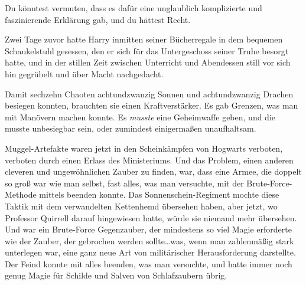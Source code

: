 Du könntest vermuten, dass es dafür eine unglaublich komplizierte und faszinierende Erklärung gab, und du hättest Recht.

Zwei Tage zuvor hatte Harry inmitten seiner Bücherregale in dem bequemen Schaukelstuhl gesessen, den er sich für das Untergeschoss seiner Truhe besorgt hatte, und in der stillen Zeit zwischen Unterricht und Abendessen still vor sich hin gegrübelt und über Macht nachgedacht.

Damit sechzehn Chaoten achtundzwanzig Sonnen und achtundzwanzig Drachen besiegen konnten, brauchten sie einen Kraftverstärker. Es gab Grenzen, was man mit Manövern machen konnte. Es \emph{musste} eine Geheimwaffe geben, und die musste unbesiegbar sein, oder zumindest einigermaßen unaufhaltsam.

Muggel-Artefakte waren jetzt in den Scheinkämpfen von Hogwarts verboten, verboten durch einen Erlass des Ministeriums. Und das Problem, einen anderen cleveren und ungewöhnlichen Zauber zu finden, war, dass eine Armee, die doppelt so groß war wie man selbst, fast alles, was man versuchte, mit der Brute-Force-Methode mittels  beenden konnte. Das Sonnenschein-Regiment mochte diese Taktik mit dem verwandelten Kettenhemd übersehen haben, aber jetzt, wo Professor Quirrell darauf hingewiesen hatte, würde sie niemand mehr übersehen. Und  war ein Brute-Force Gegenzauber, der mindestens so viel Magie erforderte wie der Zauber, der gebrochen werden sollte…was, wenn man zahlenmäßig stark unterlegen war, eine ganz neue Art von militärischer Herausforderung darstellte. Der Feind konnte mit  alles beenden, was man versuchte, und hatte immer noch genug Magie für Schilde und Salven von Schlafzaubern übrig.

